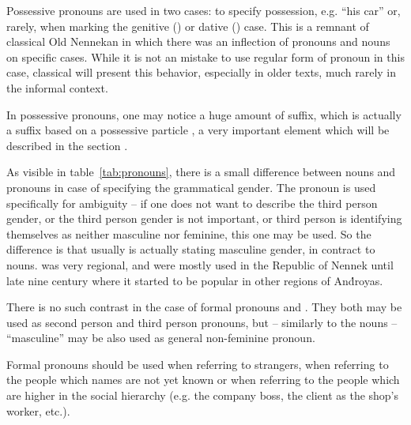 Possessive pronouns are used in two cases: to specify possession, e.g. ``his
car'' or, rarely, when marking the genitive (\Gen{}) or dative (\Dat{}) case.
This is a remnant of classical Old Nennekan in which there was an inflection of
pronouns and nouns on specific cases. While it is not an mistake to use regular
form of pronoun in this case, classical \ardo will present this behavior,
especially in older texts, much rarely in the informal context.


In possessive pronouns, one may notice a huge amount of  suffix, which
is actually a suffix based on a possessive particle , a very
important element which will be described in the section
.

As visible in table~\ref{tab:pronouns}, there is a small difference between
nouns and pronouns in case of specifying the grammatical gender. The pronoun
 is used specifically for ambiguity -- if one does not want to
describe the third person gender, or the third person gender is not important,
or third person is identifying themselves as neither masculine nor feminine,
this one may be used. So the difference is that usually  is
actually stating masculine gender, in contract to nouns.  was very
regional, and were mostly used in the Republic of Nennek until late nine century
where it started to be popular in other regions of And́royas.

There is no such contrast in the case of formal pronouns  and
. They both may be used as second person and third person pronouns,
but -- similarly to the nouns -- ``masculine''  may be also used as
general non-feminine pronoun.

Formal pronouns should be used when referring to strangers, when referring to
the people which names are not yet known or when referring to the people which
are higher in the social hierarchy (e.g. the company boss, the client as the
shop's worker, etc.).



